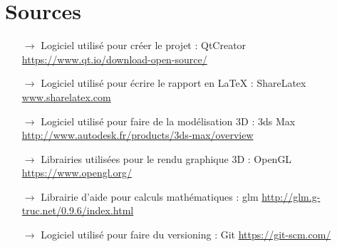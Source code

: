  \chapter*{Sources}
  \begin{itemize}
   \item[$\rightarrow$] Logiciel utilisé pour créer le projet : QtCreator \newline \url{https://www.qt.io/download-open-source/}
   \item[$\rightarrow$] Logiciel utilisé pour écrire le rapport en LaTeX : ShareLatex \newline \url{www.sharelatex.com}
   \item[$\rightarrow$] Logiciel utilisé pour faire de la modélisation 3D : 3ds Max \newline \url{http://www.autodesk.fr/products/3ds-max/overview}
   \item[$\rightarrow$] Librairies utilisées pour le rendu graphique 3D : OpenGL \newline\url{https://www.opengl.org/}
   \item[$\rightarrow$] Librairie d'aide pour calculs mathématiques : glm \newline\url{http://glm.g-truc.net/0.9.6/index.html}
   \item[$\rightarrow$] Logiciel utilisé pour faire du versioning : Git \newline\url{https://git-scm.com/}
  \end{itemize}